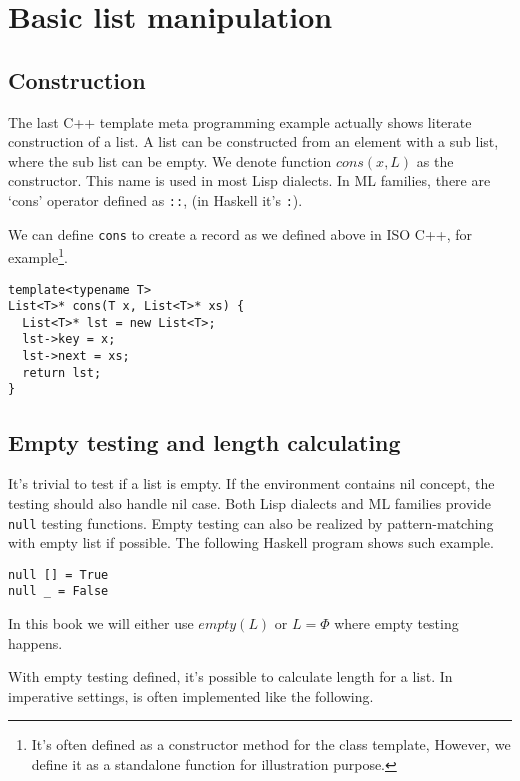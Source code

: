 \documentclass{article}
\begin{document}
\section{Basic list manipulation}

\subsection{Construction}
The last C++ template meta programming example actually shows literate construction of a list.
A list can be constructed from an element with a sub list, where the sub list can be empty.
We denote function $cons(x, L)$ as the constructor. This name is used in most Lisp dialects.
In ML families, there are `cons' operator defined as \verb|::|, (in Haskell it's \verb|:|).

We can define \verb|cons| to create a record as we defined above in ISO C++, for example\footnote{
It's often defined as a constructor method for the class template, However, we define it as a standalone
function for illustration purpose.}.

\lstset{language=C++}
\begin{lstlisting}
template<typename T>
List<T>* cons(T x, List<T>* xs) {
  List<T>* lst = new List<T>;
  lst->key = x;
  lst->next = xs;
  return lst;
}
\end{lstlisting}

\subsection{Empty testing and length calculating}
It's trivial to test if a list is empty. If the environment contains nil concept, the testing should
also handle nil case. Both Lisp dialects and ML families provide \verb|null| testing functions.
Empty testing can also be realized by pattern-matching with empty list if possible. The following
Haskell program shows such example.

\lstset{language=Haskell}
\begin{lstlisting}
null [] = True
null _ = False
\end{lstlisting}

In this book we will either use $empty(L)$ or $L = \Phi$ where empty testing happens.

With empty testing defined, it's possible to calculate length for a list. 
In imperative settings,  is often implemented like the following.
\end{document}
